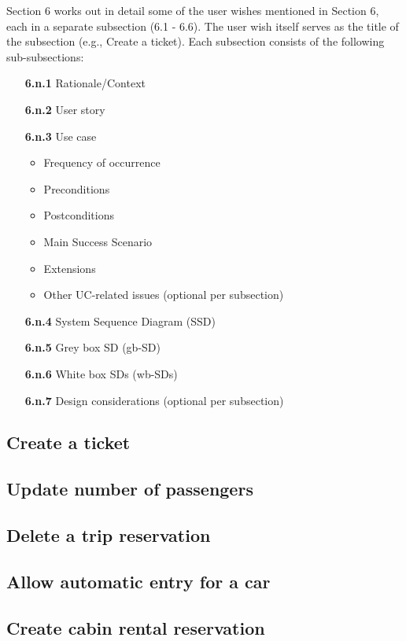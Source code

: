Section 6 works out in detail some of the user wishes mentioned in Section 6, each in a separate subsection (6.1 - 6.6). The
user wish itself serves as the title of the subsection (e.g., Create a ticket). Each subsection consists of the
following sub-subsections:
\begin{enumerate}
    \item[\textbf{6.n.1}] Rationale/Context
    \item[\textbf{6.n.2}] User story
    \item[\textbf{6.n.3}] Use case
    \begin{itemize}
        \item Frequency of occurrence
        \item Preconditions
        \item Postconditions
        \item Main Success Scenario
        \item Extensions
        \item Other UC-related issues (optional per subsection)
    \end{itemize}
    \item[\textbf{6.n.4}] System Sequence Diagram (SSD)
    \item[\textbf{6.n.5}] Grey box SD (gb-SD)
    \item[\textbf{6.n.6}] White box SDs (wb-SDs)
    \item[\textbf{6.n.7}] Design considerations (optional per subsection)
\end{enumerate}
\newpage

\subsection{Create a ticket}

\newpage

\subsection{Update number of passengers}

\newpage

\subsection{Delete a trip reservation}

\newpage

\subsection{Allow automatic entry for a car}

\newpage

\subsection{Create cabin rental reservation}

\newpage